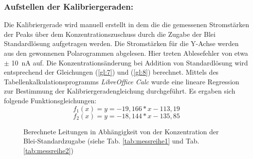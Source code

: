 	\subsubsection*{Aufstellen der Kalibriergeraden:}
	Die Kalibriergerade wird manuell erstellt in dem die die gemessenen Stromstärken der Peaks über dem Konzentrationszuschuss durch die Zugabe der Blei Standardlösung aufgetragen werden. Die Stromstärken für die Y-Achse werden aus den gewonnenen Polarogrammen abgelesen. Hier treten Ablesefehler von etwa $\pm$ \SI{10}{\nano\ampere} auf. Die Konzentrationsänderung bei Addition von Standardlösung wird entsprechend der Gleichungen (\ref{gl:7}) und (\ref{gl:8}) berechnet. Mittels des Tabellenkalkulationsprogramms \textit{LibreOffice Calc} wurde eine lineare Regression zur Bestimmung der Kalibriergeradengleichung durchgeführt. Es ergaben sich folgende Funktionsgleichungen:
	$$f_1(x)=y=-19,166*x - 113,19 $$ 
	$$f_2(x)=y=-18,144*x - 135,85 $$ 
	
	\begin{figure}[h!]
		\begin{center}
			\caption{Berechnete Leitungen in Abhängigkeit von der Konzentration der Blei-Standardzugabe (siehe Tab. \ref{tab:messreihe1} und Tab. \ref{tab:messreihe2})}
			\label{dia:lnr/lnc}
		\end{center}
	\end{figure}
	\FloatBarrier
	\vspace*{-5mm}
	
